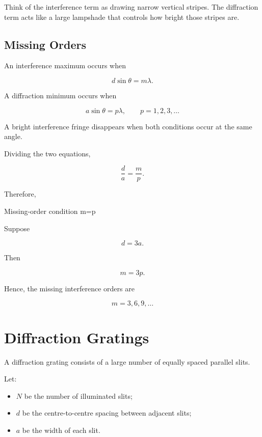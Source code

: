 \documentclass{studentnotes}
\begin{document}
\begin{personalnote}
    Think of the interference term as drawing narrow vertical stripes. The diffraction term acts like a large lampshade that controls how bright those stripes are.
\end{personalnote}

\subsection{Missing Orders}

An interference maximum occurs when

\[
    d\sin\theta=m\lambda.
\]

A diffraction minimum occurs when

\[
    a\sin\theta=p\lambda,
    \qquad
    p=1,2,3,\ldots
\]

A bright interference fringe disappears when both conditions occur at the same angle.

Dividing the two equations,

\[
    \frac{d}{a}
    =
    \frac{m}{p}.
\]

Therefore,

\begin{namedformula}{Missing-order condition}
    m=p
\end{namedformula}

\begin{example}
    Suppose

    \[
        d=3a.
    \]

    Then

    \[
        m=3p.
    \]

    Hence, the missing interference orders are

    \[
        m=3,6,9,\ldots
    \]
\end{example}

\section{Diffraction Gratings}

A diffraction grating consists of a large number of equally spaced parallel slits.

Let:

\begin{itemize}
    \item \(N\) be the number of illuminated slits;
    \item \(d\) be the centre-to-centre spacing between adjacent slits;
    \item \(a\) be the width of each slit.
\end{itemize}
\end{document}
